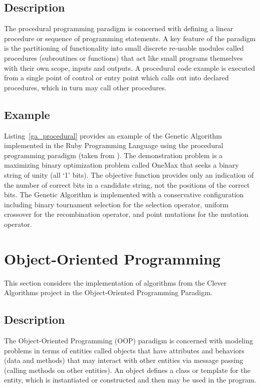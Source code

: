 \documentclass[a4paper, 11pt]{article}
\begin{document}
\subsection{Description}
The procedural programming paradigm is concerned with defining a linear procedure or sequence of programming statements. A key feature of the paradigm is the partitioning of functionality into small discrete re-usable modules called procedures (subroutines or functions) that act like small programs themselves with their own scope, inputs and outputs. A procedural code example is executed from a single point of control or entry point which calls out into declared procedures, which in turn may call other procedures.

\subsection{Example}
Listing~\ref{ga_procedural} provides an example of the Genetic Algorithm implemented in the Ruby Programming Language using the procedural programming paradigm (taken from \cite{Brownlee2010p}).  
The demonstration problem is a maximizing binary optimization problem called OneMax that seeks a binary string of unity (all `1' bits). The objective function provides only an indication of the number of correct bits in a candidate string, not the positions of the correct bits.
The Genetic Algorithm is implemented with a conservative configuration including binary tournament selection for the selection operator, uniform crossover for the recombination operator, and point mutations for the mutation operator.



\section{Object-Oriented Programming}
This section considers the implementation of algorithms from the Clever Algorithms project in the Object-Oriented Programming Paradigm.

\subsection{Description}
The Object-Oriented Programming (OOP) paradigm is concerned with modeling problems in terms of entities called objects that have attributes and behaviors (data and methods) that may interact with other entities via message passing (calling methods on other entities). An object defines a class or template for the entity, which is instantiated or constructed and then may be used in the program.
\end{document}
